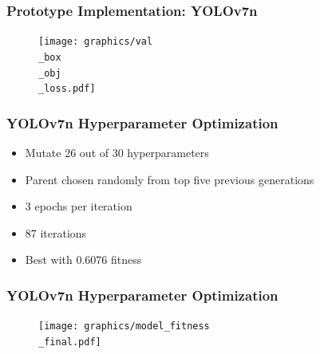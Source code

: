 \documentclass{beamer}
\begin{document}
\begin{frame}
  \frametitle{Prototype Implementation: YOLOv7n}
  \begin{figure}[htbp]
    \begin{center}
      \texttt{[image: graphics/val\\\_box\\\_obj\\\_loss.pdf]}
    \end{center}
  \end{figure}
\end{frame}

\begin{frame}
  \frametitle{YOLOv7n Hyperparameter Optimization} \pause
  \begin{itemize}
    \setlength{\itemsep}{1.1\baselineskip}
  \item Mutate 26 out of 30 hyperparameters \pause
  \item Parent chosen randomly from top five previous generations \pause
  \item 3 epochs per iteration \pause
  \item 87 iterations \pause
  \item Best with 0.6076 fitness
  \end{itemize}
\end{frame}

\begin{frame}
  \frametitle{YOLOv7n Hyperparameter Optimization}
  \begin{figure}[htbp]
    \begin{center}
      \texttt{[image: graphics/model\_fitness\\\_final.pdf]}
    \end{center}
  \end{figure}
\end{frame}
\end{document}
